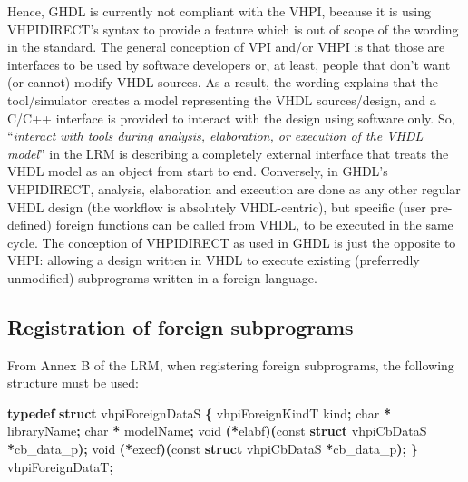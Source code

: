 \documentclass[
]{article}
\newenvironment{Shaded}{\begin{snugshade}}{\end{snugshade}}
\newcommand{\DataTypeTok}[1]{\textcolor[rgb]{0.13,0.29,0.53}{#1}}
\newcommand{\KeywordTok}[1]{\textcolor[rgb]{0.13,0.29,0.53}{\textbf{#1}}}
\newcommand{\NormalTok}[1]{#1}
\newcommand{\OperatorTok}[1]{\textcolor[rgb]{0.81,0.36,0.00}{\textbf{#1}}}
\begin{document}
Hence, GHDL is currently not compliant with the VHPI, because it is using VHPIDIRECT's syntax to provide a feature which is out of scope of the wording in the standard. The general conception of VPI and/or VHPI is that those are interfaces to be used by software developers or, at least, people that don't want (or cannot) modify VHDL sources. As a result, the wording explains that the tool/simulator creates a model representing the VHDL sources/design, and a C/C++ interface is provided to interact with the design using software only. So, ``\emph{interact with tools during analysis, elaboration, or execution of the VHDL model}'' in the LRM is describing a completely external interface that treats the VHDL model as an object from start to end. Conversely, in GHDL's VHPIDIRECT, analysis, elaboration and execution are done as any other regular VHDL design (the workflow is absolutely VHDL-centric), but specific (user pre-defined) foreign functions can be called from VHDL, to be executed in the same cycle. The conception of VHPIDIRECT as used in GHDL is just the opposite to VHPI: allowing a design written in VHDL to execute existing (preferredly unmodified) subprograms written in a foreign language.

\hypertarget{registration-of-foreign-subprograms}{%
\subsection{Registration of foreign subprograms}\label{registration-of-foreign-subprograms}}

From Annex B of the LRM, when registering foreign subprograms, the following structure must be used:

\begin{Shaded}
\begin{Highlighting}[]
\KeywordTok{typedef} \KeywordTok{struct}\NormalTok{ vhpiForeignDataS }\OperatorTok{\{}
\NormalTok{  vhpiForeignKindT kind}\OperatorTok{;}
  \DataTypeTok{char} \OperatorTok{*}\NormalTok{ libraryName}\OperatorTok{;}
  \DataTypeTok{char} \OperatorTok{*}\NormalTok{ modelName}\OperatorTok{;}
  \DataTypeTok{void} \OperatorTok{(*}\NormalTok{elabf}\OperatorTok{)(}\DataTypeTok{const} \KeywordTok{struct}\NormalTok{ vhpiCbDataS }\OperatorTok{*}\NormalTok{cb\_data\_p}\OperatorTok{);}
  \DataTypeTok{void} \OperatorTok{(*}\NormalTok{execf}\OperatorTok{)(}\DataTypeTok{const} \KeywordTok{struct}\NormalTok{ vhpiCbDataS }\OperatorTok{*}\NormalTok{cb\_data\_p}\OperatorTok{);}
\OperatorTok{\}}\NormalTok{ vhpiForeignDataT}\OperatorTok{;}
\end{Highlighting}
\end{Shaded}
\end{document}
